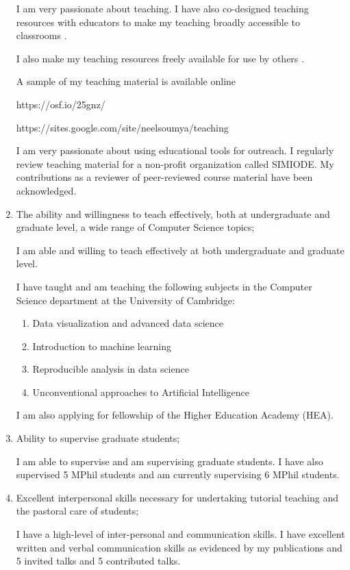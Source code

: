 \documentclass[10pt]{article}
\begin{document}
\begin{enumerate}
I am very passionate about teaching. 
I have also co-designed teaching resources with educators to make my teaching broadly
accessible to classrooms \cite{Banerjee2019a}.

I also make my teaching resources freely available for use by others \cite{Banerjee2019a}.

A sample of my teaching material is available online 

https://osf.io/25gnz/

https://sites.google.com/site/neelsoumya/teaching


I am very passionate about using educational tools for outreach. I regularly review teaching
material for a non-profit organization called SIMIODE. My contributions as a reviewer of peer-reviewed
course material have been acknowledged.

\item The ability and willingness to teach effectively, both at undergraduate and graduate level, a wide
range of Computer Science topics;

I am able and willing to teach effectively at both undergraduate and graduate level.

I have taught and am teaching the following subjects in the Computer Science department at the University of Cambridge:

\begin{enumerate}
	\item Data visualization and advanced data science
	\item Introduction to machine learning
	\item Reproducible analysis in data science
	\item Unconventional approaches to Artificial Intelligence
\end{enumerate}


I am also applying for fellowship of the Higher Education Academy (HEA).


\item Ability to supervise graduate students;

I am able to supervise and am supervising graduate students. I have also supervised 5 MPhil students and am currently supervising 6 MPhil students.

\item Excellent interpersonal skills necessary for undertaking tutorial teaching and the pastoral care of
students;


I have a high-level of inter-personal and communication skills.
I have excellent written and verbal communication skills as evidenced by my publications and 5 invited talks and 5 contributed talks.


\end{enumerate}
\end{document}
